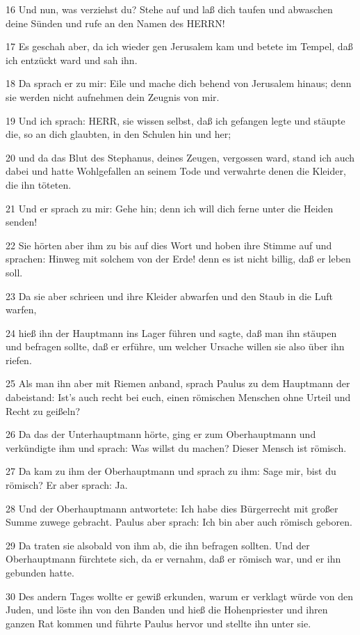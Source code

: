 \par 16 Und nun, was verziehst du? Stehe auf und laß dich taufen und abwaschen deine Sünden und rufe an den Namen des HERRN!
\par 17 Es geschah aber, da ich wieder gen Jerusalem kam und betete im Tempel, daß ich entzückt ward und sah ihn.
\par 18 Da sprach er zu mir: Eile und mache dich behend von Jerusalem hinaus; denn sie werden nicht aufnehmen dein Zeugnis von mir.
\par 19 Und ich sprach: HERR, sie wissen selbst, daß ich gefangen legte und stäupte die, so an dich glaubten, in den Schulen hin und her;
\par 20 und da das Blut des Stephanus, deines Zeugen, vergossen ward, stand ich auch dabei und hatte Wohlgefallen an seinem Tode und verwahrte denen die Kleider, die ihn töteten.
\par 21 Und er sprach zu mir: Gehe hin; denn ich will dich ferne unter die Heiden senden!
\par 22 Sie hörten aber ihm zu bis auf dies Wort und hoben ihre Stimme auf und sprachen: Hinweg mit solchem von der Erde! denn es ist nicht billig, daß er leben soll.
\par 23 Da sie aber schrieen und ihre Kleider abwarfen und den Staub in die Luft warfen,
\par 24 hieß ihn der Hauptmann ins Lager führen und sagte, daß man ihn stäupen und befragen sollte, daß er erführe, um welcher Ursache willen sie also über ihn riefen.
\par 25 Als man ihn aber mit Riemen anband, sprach Paulus zu dem Hauptmann der dabeistand: Ist's auch recht bei euch, einen römischen Menschen ohne Urteil und Recht zu geißeln?
\par 26 Da das der Unterhauptmann hörte, ging er zum Oberhauptmann und verkündigte ihm und sprach: Was willst du machen? Dieser Mensch ist römisch.
\par 27 Da kam zu ihm der Oberhauptmann und sprach zu ihm: Sage mir, bist du römisch? Er aber sprach: Ja.
\par 28 Und der Oberhauptmann antwortete: Ich habe dies Bürgerrecht mit großer Summe zuwege gebracht. Paulus aber sprach: Ich bin aber auch römisch geboren.
\par 29 Da traten sie alsobald von ihm ab, die ihn befragen sollten. Und der Oberhauptmann fürchtete sich, da er vernahm, daß er römisch war, und er ihn gebunden hatte.
\par 30 Des andern Tages wollte er gewiß erkunden, warum er verklagt würde von den Juden, und löste ihn von den Banden und hieß die Hohenpriester und ihren ganzen Rat kommen und führte Paulus hervor und stellte ihn unter sie.

